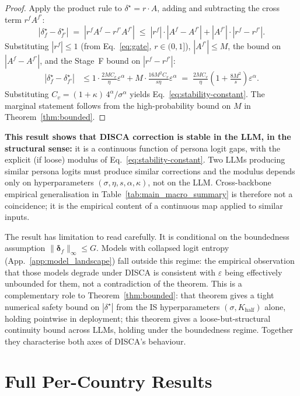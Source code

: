 \documentclass{article}
\begin{document}
\begin{proof}
Apply the product rule to $\delta^\star = r \cdot A$, adding and subtracting the cross term $r^f A^{f'}$:
\begin{equation*}
|\delta^\star_f - \delta^\star_{f'}| \;=\; |r^f A^f - r^{f'} A^{f'}| \;\leq\; |r^f|\cdot|A^f - A^{f'}| + |A^{f'}|\cdot|r^f - r^{f'}|.
\end{equation*}
Substituting $|r^f| \leq 1$ (from Eq.~\ref{eq:gate}, $r \in (0,1]$), $|A^{f'}| \leq M$, the bound on $|A^f - A^{f'}|$, and the Stage~F bound on $|r^f - r^{f'}|$:
\begin{align*}
|\delta^\star_f - \delta^\star_{f'}| 
&\leq 1 \cdot \frac{2 M C_v}{\eta}\varepsilon^\alpha + M \cdot \frac{16 M^2 C_v}{s\eta}\varepsilon^\alpha 
\;=\; \frac{2 M C_v}{\eta}\!\left(1 + \frac{8M^2}{s}\right)\varepsilon^\alpha.
\end{align*}
Substituting $C_v = (1+\kappa)\,4^\alpha/\sigma^\alpha$ yields Eq.~\ref{eq:stability-constant}. The marginal statement follows from the high-probability bound on $M$ in Theorem~\ref{thm:bounded}. 
\end{proof}


\textbf{This result shows that DISCA correction is stable in the LLM, in the structural sense:} it is a continuous function of persona logit gaps, with the explicit (if loose) modulus of Eq.~\ref{eq:stability-constant}. Two LLMs producing similar persona logits must produce similar corrections and the modulus depends only on hyperparameters $(\sigma, \eta, s, \alpha, \kappa)$, not on the LLM. Cross-backbone empirical generalisation in Table~\ref{tab:main_macro_summary} is therefore not a coincidence; it is the empirical content of a continuous map applied to similar inputs.

The result has limitation to read carefully. It is conditional on the boundedness assumption $\|\boldsymbol{\delta}_f\|_\infty \leq G$. Models with collapsed logit entropy (App.~\ref{app:model_landscape}) fall outside this regime: the empirical observation that those models degrade under DISCA is consistent with $\varepsilon$ being effectively unbounded for them, not a contradiction of the theorem. This is a complementary role to Theorem~\ref{thm:bounded}: that theorem gives a tight numerical safety bound on $|\delta^\star|$ from the IS hyperparameters $(\sigma, K_{\text{half}})$ alone, holding pointwise in deployment; this theorem gives a loose-but-structural continuity bound across LLMs, holding under the boundedness regime. Together they characterise both axes of DISCA's behaviour.

\section{Full Per-Country Results}
\label{app:percountry_full}
\end{document}
